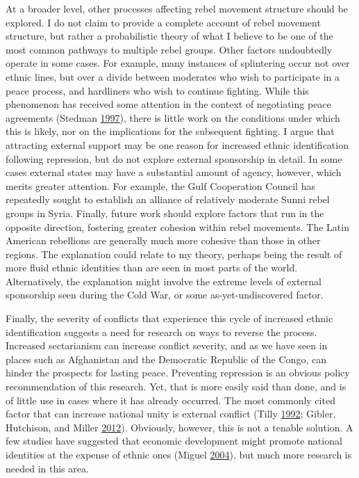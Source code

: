 \documentclass[12pt,]{book}
\theoremstyle{definition}
\theoremstyle{definition}
\theoremstyle{remark}
\begin{document}
At a broader level, other processes affecting rebel movement structure
should be explored. I do not claim to provide a complete account of
rebel movement structure, but rather a probabilistic theory of what I
believe to be one of the most common pathways to multiple rebel groups.
Other factors undoubtedly operate in some cases. For example, many
instances of splintering occur not over ethnic lines, but over a divide
between moderates who wish to participate in a peace process, and
hardliners who wish to continue fighting. While this phenomenon has
received some attention in the context of negotiating peace agreements
(Stedman \protect\hyperlink{ref-Stedman1997}{1997}), there is little
work on the conditions under which this is likely, nor on the
implications for the subsequent fighting. I argue that attracting
external support may be one reason for increased ethnic identification
following repression, but do not explore external sponsorship in detail.
In some cases external states may have a substantial amount of agency,
however, which merits greater attention. For example, the Gulf
Cooperation Council has repeatedly sought to establish an alliance of
relatively moderate Sunni rebel groups in Syria. Finally, future work
should explore factors that run in the opposite direction, fostering
greater cohesion within rebel movements. The Latin American rebellions
are generally much more cohesive than those in other regions. The
explanation could relate to my theory, perhaps being the result of more
fluid ethnic identities than are seen in most parts of the world.
Alternatively, the explanation might involve the extreme levels of
external sponsorship seen during the Cold War, or some
as-yet-undiscovered factor.

Finally, the severity of conflicts that experience this cycle of
increased ethnic identification suggests a need for research on ways to
reverse the process. Increased sectarianism can increase conflict
severity, and as we have seen in places such as Afghanistan and the
Democratic Republic of the Congo, can hinder the prospects for lasting
peace. Preventing repression is an obvious policy recommendation of this
research. Yet, that is more easily said than done, and is of little use
in cases where it has already occurred. The most commonly cited factor
that can increase national unity is external conflict (Tilly
\protect\hyperlink{ref-Tilly1992}{1992}; Gibler, Hutchison, and Miller
\protect\hyperlink{ref-Gibler2012}{2012}). Obviously, however, this is
not a tenable solution. A few studies have suggested that economic
development might promote national identities at the expense of ethnic
ones (Miguel \protect\hyperlink{ref-Miguel2004b}{2004}), but much more
research is needed in this area.
\end{document}
